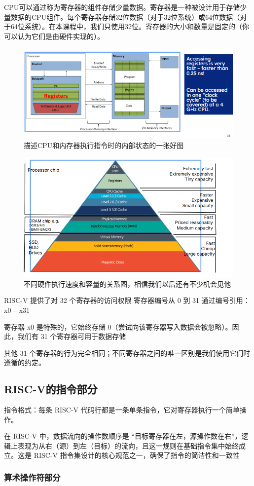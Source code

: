 \documentclass{ctexart}
\begin{document}
CPU可以通过称为寄存器的组件存储少量数据。寄存器是一种被设计用于存储少量数据的CPU组件。每个寄存器存储32位数据（对于32位系统）或64位数据（对于64位系统）。在本课程中，我们只使用32位。寄存器的大小和数量是固定的（你可以认为它们是由硬件实现的）。 \par
\begin{figure}
    \centering
    \includegraphics[width=0.5\linewidth]{描述CPU和内存在执行指令是的内部状态.png}
    \caption{描述CPU和内存器执行指令时的内部状态的一张好图}
    \label{fig:enter-label}
\end{figure}
\begin{figure}
    \centering
    \includegraphics[width=0.5\linewidth]{不同硬件执行速度和容量的关系图.png}
    \caption{不同硬件执行速度和容量的关系图，相信我们以后还有不少机会见他}
    \label{fig:enter-label}
\end{figure}
RISC-V 提供了对 32 个寄存器的访问权限
寄存器编号从 0 到 31
通过编号引用：x0 – x31\par
寄存器 x0 是特殊的，它始终存储 0（尝试向该寄存器写入数据会被忽略）。因此，我们有 31 个寄存器可用于数据存储\par
其他 31 个寄存器的行为完全相同；不同寄存器之间的唯一区别是我们使用它们时遵循的约定。
\subsection{RISC-V的指令部分}
指令格式：每条 RISC-V 代码行都是一条单条指令，它对寄存器执行一个简单操作。\par
在 RISC-V 中，数据流向的操作数顺序是 “目标寄存器在左，源操作数在右”，逻辑上表现为从右（源）到左（目标）的流向，且这一规则在基础指令集中始终成立。这是 RISC-V 指令集设计的核心规范之一，确保了指令的简洁性和一致性
\subsubsection{算术操作符部分}
\end{document}
